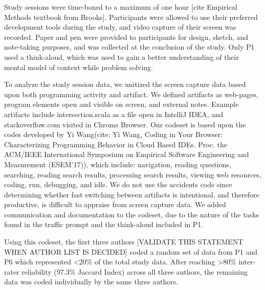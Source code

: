 Study sessions were time-boxed to a maximum of one hour [cite Empirical Methods textbook from Brooks]. Participants were allowed to use their preferred development tools during the study, and video capture of their screen was recorded. Paper and pen were provided to participants for design, sketch, and note-taking purposes, and was collected at the conclusion of the study. Only P1 used a think-aloud, which was used to gain a better understanding of their mental model of context while problem solving.

To analyze the study session data, we unitized the screen capture data based upon both programming activity and artifact. We defined artifacts as web-pages, program elements open and visible on screen, and external notes. Example artifacts include intersection.scala as a file open in IntelliJ IDEA, and stackoverflow.com visited in Chrome Browser. Our codeset is based upon the codes developed by Yi Wang(cite: Yi Wang, Coding in Your Browser: Characterizing Programming Behavior in Cloud Based IDEs. Proc. the ACM/IEEE International Symposium on Empirical Software Engineering and Measurement (ESEM'17)), which include: navigation, reading questions, searching, reading search results, processing search results, viewing web resources, coding, run, debugging, and idle. We do not use the accidents code since determining whether fast switching between artifacts is intentional, and therefore productive, is difficult to appraise from screen capture data. We added communication and documentation to the codeset, due to the nature of the tasks found in the traffic prompt and the think-aloud included in P1.


Using this codeset, the first three authors [VALIDATE THIS STATEMENT WHEN AUTHOR LIST IS DECIDED] coded a random set of data from P1 and P6 which represented <20\% of the total study data. After reaching >80\% inter-rater reliability (97.3\% Jaccard Index) across all three authors, the remaining data was coded individually by the same three authors.
